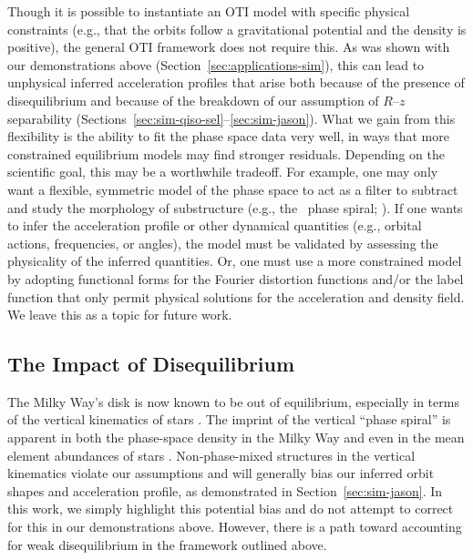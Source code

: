 \documentclass[modern]{aastex631}
\begin{document}
Though it is possible to instantiate an OTI model with specific physical constraints
(e.g., that the orbits follow a gravitational potential and the density is positive),
the general OTI framework does not require this.
As was shown with our demonstrations above (Section~\ref{sec:applications-sim}), this
can lead to unphysical inferred acceleration profiles that arise both because of the
presence of disequilibrium and because of the breakdown of our assumption of $R$--$z$
separability (Sections~\ref{sec:sim-qiso-sel}--\ref{sec:sim-jason}).
What we gain from this flexibility is the ability to fit the phase space data very well,
in ways that more constrained equilibrium models may find stronger residuals.
Depending on the scientific goal, this may be a worthwhile tradeoff.
For example, one may only want a flexible, symmetric model of the phase space to act as
a filter to subtract and study the morphology of substructure (e.g., the \gaia\ phase
spiral; \citealt{Antoja:2018}).
If one wants to infer the acceleration profile or other dynamical quantities (e.g.,
orbital actions, frequencies, or angles), the model must be validated by assessing the
physicality of the inferred quantities.
Or, one must use a more constrained model by adopting functional forms for the Fourier
distortion functions and/or the label function that only permit physical solutions for
the acceleration and density field.
We leave this as a topic for future work.


\subsection{The Impact of Disequilibrium} \label{sec:disc-diseq}

The Milky Way's disk is now known to be out of equilibrium, especially in terms of the
vertical kinematics of stars \citep[e.g.,][]{Antoja:2018, Katz:2018, Ramos:2018,
Tian:2018, Laporte:2019, Khanna:2019, Hunt:2022, Darragh-Ford:2023}.
The imprint of the vertical ``phase spiral'' is apparent in both the phase-space density
in the Milky Way and even in the mean element abundances of stars
\citep{Frankel:inprep}.
Non-phase-mixed structures in the vertical kinematics violate our assumptions and will
generally bias our inferred orbit shapes and acceleration profile, as demonstrated in
Section~\ref{sec:sim-jason}.
In this work, we simply highlight this potential bias and do not attempt to correct for
this in our demonstrations above.
However, there is a path toward accounting for weak disequilibrium in the framework
outlined above.
\end{document}
